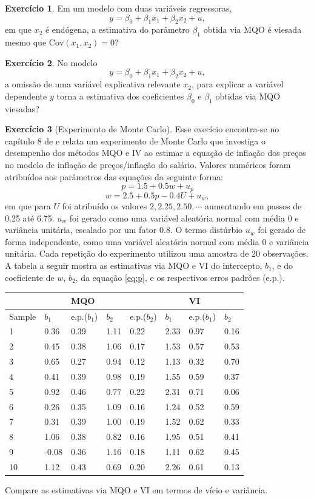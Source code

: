 \documentclass[
]{book}
\theoremstyle{definition}
\theoremstyle{definition}
\theoremstyle{definition}
\newtheorem{exercise}{Exercício}[chapter]
\theoremstyle{remark}
\begin{document}
\begin{exercise}
\protect\hypertarget{exr:exvi10}{}{\label{exr:exvi10} }Em um modelo com duas variáveis regressoras,
\[y=\beta_0+\beta_1x_1+\beta_2x_2+u,\]
em que \(x_2\) é endógena, a estimativa do parâmetro \(\beta_1\) obtida via MQO é viesada mesmo que \(\mbox{Cov}(x_1,x_2)=0\)?
\end{exercise}

\begin{exercise}
\protect\hypertarget{exr:exvi11}{}{\label{exr:exvi11} }No modelo
\[y=\beta_0+\beta_1x_1+\beta_2x_2+u,\]
a omissão de uma variável explicativa relevante \(x_2\), para explicar a variável dependente \(y\) torna a estimativa dos coeficientes \(\beta_0\) e \(\beta_1\) obtidas via MQO viesadas?
\end{exercise}

\begin{exercise}[Experimento de Monte Carlo]
\protect\hypertarget{exr:exvi12}{}{\label{exr:exvi12} {} }Esse execício encontra-se no capítulo 8 de \citet{dougherty2011} e relata um experimento de Monte Carlo que investiga o desempenho dos métodos MQO e IV ao estimar a equação de inflação dos preços no modelo de inflação de preços/inflação do salário. Valores numéricos foram atribuídos aos parâmetros das equações da seguinte forma:
\begin{equation}
p = 1.5  + 0.5w +u_p
\label{eq:p}
\end{equation}
\[w = 2.5 + 0.5p - 0.4U + u_w, \]
em que para \(U\) foi atribuído os valores \(2, 2.25,2.50,\cdots\) aumentando em passos de 0.25 até 6.75. \(u_w\) foi gerado como uma
variável aleatória normal com média 0 e variância unitária, escalado por um fator \(0.8\). O termo distúrbio \(u_w\) foi gerado de forma independente, como uma variável aleatória normal com média 0 e variância unitária. Cada repetição do experimento utilizou uma amostra de 20 observações. A tabela a seguir mostra as estimativas via MQO e VI do intercepto, \(b_1\), e do coeficiente de \(w\), \(b_2\), da equação \eqref{eq:p}, e os respectivos erros padrões (e.p.).

\begin{longtable}[]{@{}llllllll@{}}
\toprule
& & MQO & & & & VI &\tabularnewline
\midrule
\endhead
Sample & \(b_1\) & e.p.(\(b_1\)) & \(b_2\) & e.p.(\(b_2\)) & \(b_1\) & e.p.(\(b_1\)) & \(b_2\)\tabularnewline
1 & 0.36 & 0.39 & 1.11 & 0.22 & 2.33 & 0.97 & 0.16\tabularnewline
2 & 0.45 & 0.38 & 1.06 & 0.17 & 1.53 & 0.57 & 0.53\tabularnewline
3 & 0.65 & 0.27 & 0.94 & 0.12 & 1.13 & 0.32 & 0.70\tabularnewline
4 & 0.41 & 0.39 & 0.98 & 0.19 & 1.55 & 0.59 & 0.37\tabularnewline
5 & 0.92 & 0.46 & 0.77 & 0.22 & 2.31 & 0.71 & 0.06\tabularnewline
6 & 0.26 & 0.35 & 1.09 & 0.16 & 1.24 & 0.52 & 0.59\tabularnewline
7 & 0.31 & 0.39 & 1.00 & 0.19 & 1.52 & 0.62 & 0.33\tabularnewline
8 & 1.06 & 0.38 & 0.82 & 0.16 & 1.95 & 0.51 & 0.41\tabularnewline
9 & -0.08 & 0.36 & 1.16 & 0.18 & 1.11 & 0.62 & 0.45\tabularnewline
10 & 1.12 & 0.43 & 0.69 & 0.20 & 2.26 & 0.61 & 0.13\tabularnewline
\bottomrule
\end{longtable}

Compare as estimativas via MQO e VI em termos de vício e variância.
\end{exercise}
\end{document}
